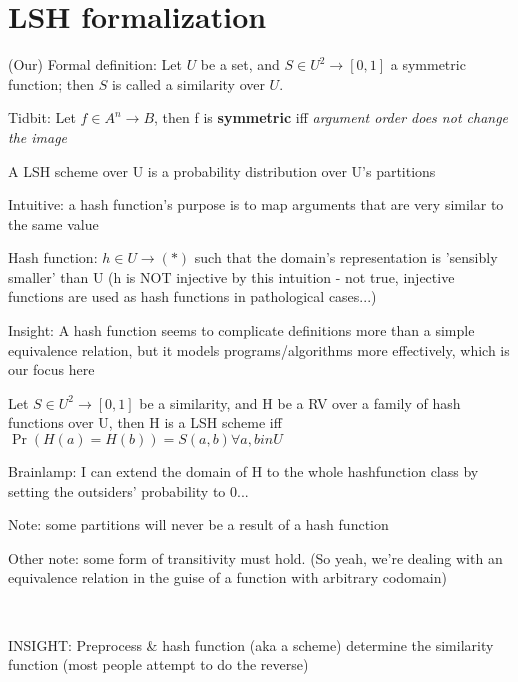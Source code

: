 \documentclass{report}
\begin{document}
	
\section{LSH formalization}

    (Our) Formal definition: Let $U$ be a set, and $S \in U^2 \to [0, 1]$ a symmetric function; then $S$ is called a similarity over $U$.
	
	Tidbit: Let $f \in A^n \to B$, then f is \textbf{symmetric} iff \textit{argument order does not change the image} %
	
	A LSH scheme over U is a probability distribution over U's partitions
	
	
	Intuitive: a hash function's purpose is to map arguments that are very similar to the same value
	
	Hash function: $h \in U \to (*)$ such that the domain's representation is 'sensibly smaller' than U (h is NOT injective by this intuition - not true, injective functions are used as hash functions in pathological cases...)
	
	Insight: A hash function seems to complicate definitions more than a simple equivalence relation, but it models programs/algorithms more effectively, which is our focus here
	
	
	Let $S \in U^2 \to [0, 1]$ be a similarity, and H be a RV over a family of hash functions over U, then H is a LSH scheme iff $\Pr(H(a)=H(b)) = S(a,b) \forall a,b in U$
	
	Brainlamp: I can extend the domain of H to the whole hashfunction class by setting the outsiders' probability to 0...
	
	
	Note: some partitions will never be a result of a hash function 
	
	Other note: some form of transitivity must hold. (So yeah, we're dealing with an equivalence relation in the guise of a function with arbitrary codomain)
	
	\
	
	INSIGHT: Preprocess \& hash function (aka a scheme) determine the similarity function (most people attempt to do the reverse)
	
\end{document}

